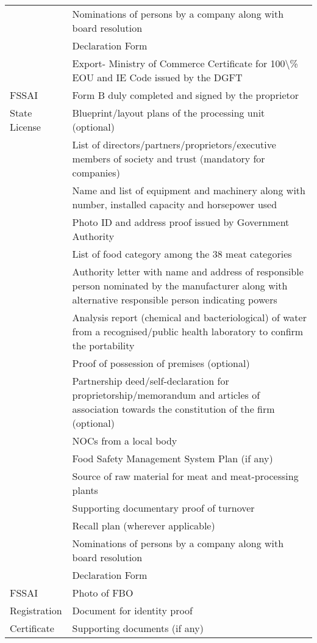 \documentclass[a4paper, 12pt]{article}
\begin{document}
\begin{longtable}{>{\raggedright}p{2.5cm}>{\raggedright\arraybackslash}p{13cm}}
          & Nominations of persons by a company along with board resolution \\
          & Declaration Form \\
          & Export- Ministry of Commerce Certificate for 100\textbackslash{}\% EOU and IE Code issued by the DGFT \\
    \midrule
    FSSAI & Form B duly completed and signed by the proprietor\\
    State License & Blueprint/layout plans of the processing unit (optional) \\
    & List of directors/partners/proprietors/executive members of society and trust (mandatory for companies) \\
          & Name and list of equipment and machinery along with number, installed capacity and horsepower used \\
          & Photo ID and address proof issued by Government Authority \\
          & List of food category among the 38 meat categories \\
          & Authority letter with name and address of responsible person nominated by the manufacturer along with alternative responsible person indicating powers   \\
          & Analysis report (chemical and bacteriological) of water from a recognised/public health laboratory to confirm the portability \\
          & Proof of possession of premises (optional) \\
          & Partnership deed/self-declaration for proprietorship/memorandum and articles of association towards the constitution of the firm (optional) \\
          & NOCs from a local body \\
          & Food Safety Management System Plan (if any) \\
          & Source of raw material for meat and meat-processing plants \\
          & Supporting documentary proof of turnover \\
          & Recall plan (wherever applicable) \\
          & Nominations of persons by a company along with board resolution \\
          & Declaration Form \\
    \midrule
    FSSAI & Photo of FBO \\
    Registration & Document for identity proof \\
    Certificate & Supporting documents (if any) \\
    \end{longtable}%
  \label{tab:addlabel}%
\end{document}
